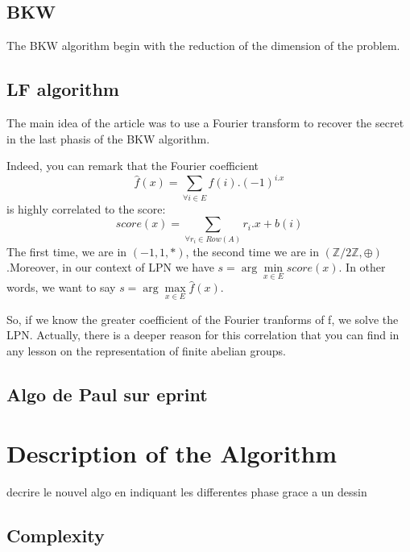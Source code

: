 \documentclass{llncs}		%
\newcommand{\argmin}{\arg\!\min}
\newcommand{\argmax}{\arg\!\max}
\begin{document}
\subsection{BKW}
The BKW algorithm begin with the reduction of the dimension of the problem.

\begin{framed}
\begin{algorithmic}
\EndFunction
\end{algorithmic}
\end{framed}





\subsection{LF algorithm}
The main idea of the article \cite{LF} was to use a Fourier transform to recover
the secret in the last phasis of the BKW algorithm.

Indeed, you can remark that the Fourier coefficient
$$\hat{f}(x)= \sum \limits_{\forall i \in E} f(i).(-1)^{i.x}$$
is highly correlated to the score: $$score(x)=\sum\limits_{\forall r_i\in
Row(A)}r_i.x+b(i)$$ The first time, we are in $({-1,1},*)$, the second time we
are in $(\mathbb{Z}/2\mathbb{Z},\oplus)$.Moreover, in our context of LPN we have
$s=\argmin\limits_{x \in E} score(x)$. In other words, we want to say $s = \argmax\limits_{x\in
E} \hat{f}(x)$.

So, if we know the greater coefficient of the Fourier tranforms of f, we solve
the LPN. Actually, there is a deeper reason for this correlation that you can find in any
lesson on the representation of finite abelian groups. 

\subsection{Algo de Paul sur eprint}



\section{Description of the Algorithm}

decrire le nouvel algo en indiquant les differentes phase grace a un dessin

\subsection{Complexity}
\end{document}

